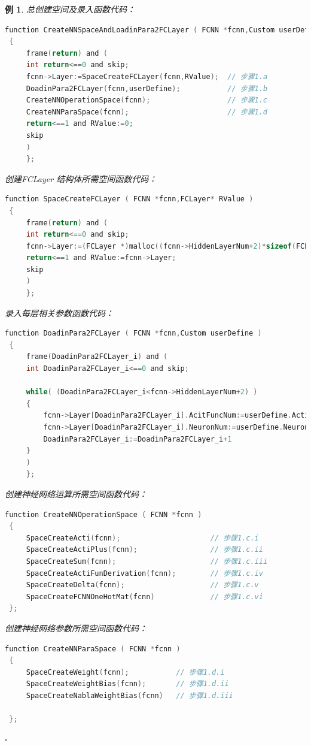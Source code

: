 \documentclass[UTF-8]{progbookcn}
\newtheorem{example}{例}[chapter]         %
\begin{document}
\begin{example}
总创建空间及录入函数代码：
\begin{lstlisting}[language=C,caption={函数 23 CreateNNSpaceAndLoadinPara2FCLayer}]
  function CreateNNSpaceAndLoadinPara2FCLayer ( FCNN *fcnn,Custom userDefine,int RValue )
 {
     frame(return) and (
     int return<==0 and skip;
     fcnn->Layer:=SpaceCreateFCLayer(fcnn,RValue);  // 步骤1.a
     DoadinPara2FCLayer(fcnn,userDefine);           // 步骤1.b
     CreateNNOperationSpace(fcnn);                  // 步骤1.c
     CreateNNParaSpace(fcnn);                       // 步骤1.d
     return<==1 and RValue:=0;
     skip
     )
     };
\end{lstlisting}

\noindent 创建{\setsansfont{Myriad Pro}FCLayer} 结构体所需空间函数代码：
\begin{lstlisting}[language=C,caption={函数 3 SpaceCreateFCLayer}]
function SpaceCreateFCLayer ( FCNN *fcnn,FCLayer* RValue )
 {
     frame(return) and (
     int return<==0 and skip;
     fcnn->Layer:=(FCLayer *)malloc((fcnn->HiddenLayerNum+2)*sizeof(FCLayer));  // 步骤1.a.i
     return<==1 and RValue:=fcnn->Layer;
     skip
     )
     };
\end{lstlisting}

\noindent 录入每层相关参数函数代码：
\begin{lstlisting}[language=C,caption={函数 22 DoadinPara2FCLayer}]
 function DoadinPara2FCLayer ( FCNN *fcnn,Custom userDefine )
 {
     frame(DoadinPara2FCLayer_i) and (
     int DoadinPara2FCLayer_i<==0 and skip;

     while( (DoadinPara2FCLayer_i<fcnn->HiddenLayerNum+2) )
     {
         fcnn->Layer[DoadinPara2FCLayer_i].AcitFuncNum:=userDefine.ActiFuncNumArray[DoadinPara2FCLayer_i];  // 步骤1.b.i
         fcnn->Layer[DoadinPara2FCLayer_i].NeuronNum:=userDefine.NeuronNumArray[DoadinPara2FCLayer_i];      // 步骤1.b.ii
         DoadinPara2FCLayer_i:=DoadinPara2FCLayer_i+1
     }
     )
     };
\end{lstlisting}

\noindent 创建神经网络运算所需空间函数代码：
\begin{lstlisting}[language=C,caption={函数 19 CreateNNOperationSpace}]
  function CreateNNOperationSpace ( FCNN *fcnn )
 {
     SpaceCreateActi(fcnn);                     // 步骤1.c.i
     SpaceCreateActiPlus(fcnn);                 // 步骤1.c.ii
     SpaceCreateSum(fcnn);                      // 步骤1.c.iii
     SpaceCreateActiFunDerivation(fcnn);        // 步骤1.c.iv
     SpaceCreateDelta(fcnn);                    // 步骤1.c.v
     SpaceCreateFCNNOneHotMat(fcnn)             // 步骤1.c.vi
 };
\end{lstlisting}

\noindent 创建神经网络参数所需空间函数代码：
\begin{lstlisting}[language=C,caption={函数 21 CreateNNParaSpace}]
function CreateNNParaSpace ( FCNN *fcnn )
 {
     SpaceCreateWeight(fcnn);           // 步骤1.d.i
     SpaceCreateWeightBias(fcnn);       // 步骤1.d.ii
     SpaceCreateNablaWeightBias(fcnn)   // 步骤1.d.iii

 };
\end{lstlisting}
\hfill$\square$\end{example}
\end{document}
